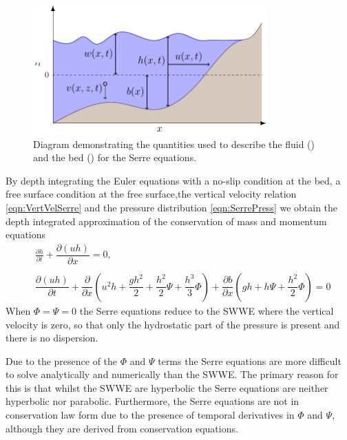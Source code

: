 \begin{figure}
	\centering
	\includegraphics[width=0.8\textwidth]{./chp2/figures/SerreModel.pdf}
	\caption{Diagram demonstrating the quantities used to describe the fluid () and the bed () for the Serre equations.}
	\label{fig:WaterModel}
\end{figure}
By depth integrating the Euler equations \cite{Su-Gardener-1969-536,Zoppou-2014} with a no-slip condition at the bed, a free surface condition at the free surface,the vertical velocity relation \eqref{eqn:VertVelSerre} and the pressure distribution \eqref{eqn:SerrePress} we obtain the depth integrated approximation of the conservation of mass and momentum equations
\begin{subequations}
	\begin{align}
	&\frac{\partial h}{\partial t} + \dfrac{\partial (uh)}{\partial x} = 0,  \label{eqn:FullSerreNonConMass} \\ \nonumber \\
	&\dfrac{\partial (uh)}{\partial t} + \dfrac{\partial}{\partial x} \left ( u^2h + \dfrac{gh^2}{2} + \dfrac{h^2}{2}{\Psi} + \dfrac{h^3}{3}{ \Phi }  \right )  +  \dfrac{\partial b}{\partial x} \left (gh +   h \Psi + \dfrac{h^2}{2}{ \Phi }  \right ) = 0	\label{eqn:FullSerreNonConMome}
	\end{align}
	\label{eqn:FullSerreNonCon}
\end{subequations}
When $\Phi = \Psi = 0$ the Serre equations reduce to the SWWE where the vertical velocity is zero, so that only the hydrostatic part of the pressure is present and there is no dispersion. 

Due to the presence of the $\Phi$ and $\Psi$ terms the Serre equations are more difficult to solve analytically and numerically than the SWWE. The primary reason for this is that whilst the SWWE are hyperbolic the Serre equations are neither hyperbolic nor parabolic. Furthermore, the Serre equations are not in conservation law form due to the presence of temporal derivatives in $\Phi$ and $\Psi$, although they are derived from conservation equations. 

